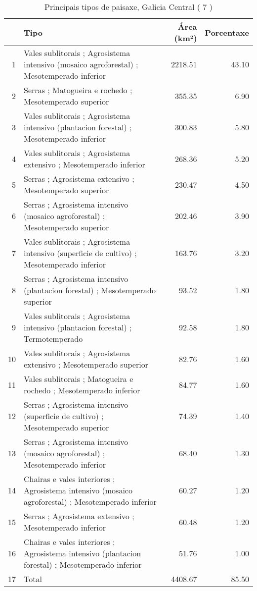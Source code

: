 \begin{table}[p]
\centering
\caption{Principais tipos de paisaxe,  Galicia Central ( 7 )} 
\label{Tipos 7}
\begin{tabular}{rlrr}
  \hline
 & Tipo & Área (km²) & Porcentaxe \\ 
  \hline
1 & Vales sublitorais ; Agrosistema intensivo (mosaico agroforestal) ; Mesotemperado inferior & 2218.51 & 43.10 \\ 
  2 & Serras ; Matogueira e rochedo ; Mesotemperado superior & 355.35 & 6.90 \\ 
  3 & Vales sublitorais ; Agrosistema intensivo (plantacion forestal) ; Mesotemperado inferior & 300.83 & 5.80 \\ 
  4 & Vales sublitorais ; Agrosistema extensivo ; Mesotemperado inferior & 268.36 & 5.20 \\ 
  5 & Serras ; Agrosistema extensivo ; Mesotemperado superior & 230.47 & 4.50 \\ 
  6 & Serras ; Agrosistema intensivo (mosaico agroforestal) ; Mesotemperado superior & 202.46 & 3.90 \\ 
  7 & Vales sublitorais ; Agrosistema intensivo (superficie de cultivo) ; Mesotemperado inferior & 163.76 & 3.20 \\ 
  8 & Serras ; Agrosistema intensivo (plantacion forestal) ; Mesotemperado superior & 93.52 & 1.80 \\ 
  9 & Vales sublitorais ; Agrosistema intensivo (plantacion forestal) ; Termotemperado & 92.58 & 1.80 \\ 
  10 & Vales sublitorais ; Agrosistema extensivo ; Mesotemperado superior & 82.76 & 1.60 \\ 
  11 & Vales sublitorais ; Matogueira e rochedo ; Mesotemperado inferior & 84.77 & 1.60 \\ 
  12 & Serras ; Agrosistema intensivo (superficie de cultivo) ; Mesotemperado superior & 74.39 & 1.40 \\ 
  13 & Serras ; Agrosistema intensivo (mosaico agroforestal) ; Mesotemperado inferior & 68.40 & 1.30 \\ 
  14 & Chairas e vales interiores ; Agrosistema intensivo (mosaico agroforestal) ; Mesotemperado inferior & 60.27 & 1.20 \\ 
  15 & Serras ; Agrosistema extensivo ; Mesotemperado inferior & 60.48 & 1.20 \\ 
  16 & Chairas e vales interiores ; Agrosistema intensivo (plantacion forestal) ; Mesotemperado inferior & 51.76 & 1.00 \\ 
  17 & Total & 4408.67 & 85.50 \\ 
   \hline
\end{tabular}
\end{table}
